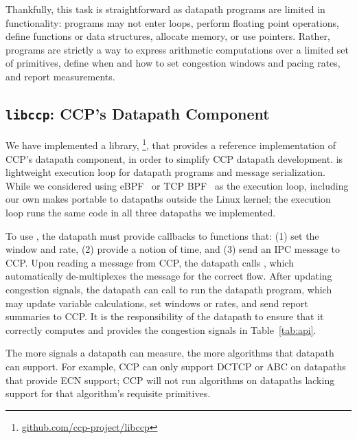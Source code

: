 Thankfully, this task is straightforward as datapath programs are limited in functionality: 
programs may not enter loops, perform floating point operations, define functions or data structures, allocate memory, or use pointers. Rather, programs are strictly a way to express arithmetic computations over a limited set of primitives, define when and how to set congestion windows and pacing rates, and report measurements.

\subsection{\texttt{libccp}: CCP's Datapath Component}
\label{s:datapath:libccp}
We have implemented a library, \footnote{\url{github.com/ccp-project/libccp}}, that provides a reference
implementation of CCP's datapath component, in order to simplify CCP datapath development.
 is lightweight execution loop for
datapath programs and message serialization. 
While we considered using eBPF~\cite{ebpf} or TCP BPF~\cite{tcpbpf}
as the execution loop, including our own makes  portable to datapaths outside the Linux kernel; the execution loop runs the same code in all three datapaths we implemented.

To use , the datapath must provide callbacks to functions that: (1) set the window and rate, (2) provide a notion of time, and (3) send an IPC message to CCP. Upon reading a message from CCP, the datapath calls , which automatically de-multiplexes the message for the correct flow. After updating congestion signals, the datapath can call  to run the datapath program, which may update variable calculations, set windows or rates,
and send report summaries to CCP. It is the responsibility of the datapath to ensure that it correctly computes and provides the congestion signals in Table~\ref{tab:api}.

The more signals a datapath can measure, the more algorithms that datapath can support. For example, CCP can only support DCTCP \cite{DCTCP} or ABC \cite{abc} on datapaths that provide ECN support; CCP will not run algorithms on datapaths lacking support for that algorithm’s requisite primitives.

